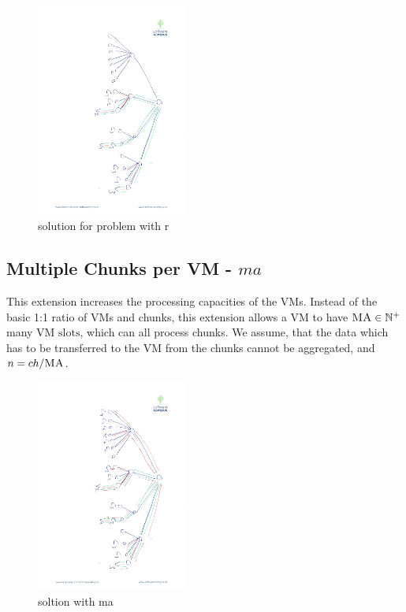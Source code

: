 \documentclass[9pt,twocolumn]{scrartcl}
\newcommand{\VmSlot}{\text{VM slot}}
\newcommand{\VmSlots}{\VmSlot\text{s}}
\newcommand{\MaFactor}{\ensuremath{\textsc{MA}}}
\newcommand{\Vms}{\ensuremath{n}}
\newcommand{\ChunkTypes}{\ensuremath{ch}}
\begin{document}
\begin{figure}

\includegraphics[angle=90,origin=c, height=7cm]{figs/model_fig_skteches/r_cv}
\caption{solution for problem with r}
\end{figure}




\subsection{Multiple Chunks per VM - $ma$}

This extension increases the processing capacities of the VMs. Instead of the
basic 1:1 ratio of VMs and chunks, this extension allows a VM to have $\MaFactor
\in \mathbb{N}^+$ many $\VmSlots$, which can all process chunks. We assume,
that the data which has to
be transferred to the VM from the chunks cannot be aggregated, and $\Vms =
\ChunkTypes / \MaFactor$.

\begin{figure}

\includegraphics[angle=90,origin=c, height=7cm]{figs/model_fig_skteches/ma_r_cv}
\caption{soltion with ma}
\end{figure}
\end{document}
